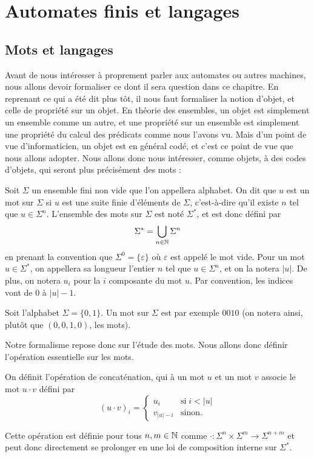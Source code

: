 \section{Automates finis et langages}

\subsection{Mots et langages}

Avant de nous intéresser à proprement parler aux automates ou autres machines, nous allons devoir formaliser ce dont il sera question dans ce chapitre. En reprenant ce qui a été dit plus tôt, il nous faut formaliser la notion d'objet, et celle de propriété sur un objet. En théorie des ensembles, un objet est simplement un ensemble comme un autre, et une propriété sur un ensemble est simplement une propriété du calcul des prédicats comme nous l'avons vu. Mais d'un point de vue d'informaticien, un objet est en général codé, et c'est ce point de vue que nous allons adopter. Nous allons donc nous intéresser, comme objets, à des \og codes d'objets\fg{}, qui seront plus précisément des mots :

\begin{defi}
    Soit $\Sigma$ un ensemble fini non vide que l'on appellera alphabet. On dit que $u$ est un mot sur $\Sigma$ si $u$ est une suite finie d'éléments de $\Sigma$, c'est-à-dire qu'il existe $n$ tel que $u\in\Sigma^n$. L'ensemble des mots sur $\Sigma$ est noté $\Sigma^*$, et est donc défini par $$\Sigma^*=\bigcup_{n\in \mathbb{N}} \Sigma^n$$ en prenant la convention que $\Sigma^0 = \{\varepsilon\}$ où $\varepsilon$ est appelé le mot vide. Pour un mot $u\in \Sigma^*$, on appellera sa longueur l'entier $n$ tel que $u\in\Sigma^n$, et on la notera $|u|$. De plus, on notera $u_i$ pour la $i$\ieme{} composante du mot $u$. Par convention, les indices vont de $0$ à $|u|-1$.
\end{defi}

\begin{expl}
    Soit l'alphabet $\Sigma=\{0,1\}$. Un mot sur $\Sigma$ est par exemple $0010$ (on notera ainsi, plutôt que $(0,0,1,0)$, les mots).
\end{expl}

Notre formalisme repose donc sur l'étude des mots. Nous allons donc définir l'opération essentielle sur les mots.

\begin{defi}[Concaténation]
    On définit l'opération de concaténation, qui à un mot $u$ et un mot $v$ associe le mot $u\cdot v$ défini par $$(u\cdot v)_i =\left\{\begin{array}{ll} u_i & \mbox{si}\; i<|u| \\ v_{|u|-i} & \mbox{sinon.} \end{array}\right.$$

    Cette opération est définie pour tous $n,m\in\mathbb{N}$ comme $\cdot : \Sigma^n\times \Sigma^m \to \Sigma^{n+m}$ et peut donc directement se prolonger en une loi de composition interne sur $\Sigma^*$.
\end{defi}

